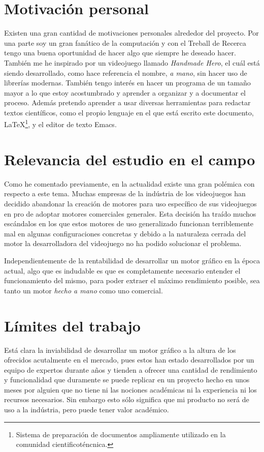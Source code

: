 \section{Motivación personal}
Existen una gran cantidad de motivaciones personales alrededor del proyecto. Por una parte soy un gran fanático de la computación y con el Treball de Recerca tengo una buena oportunidad de hacer algo que siempre he deseado hacer. También me he inspirado por un videojuego llamado \textit{Handmade Hero}, el cuál está siendo desarrollado, como hace referencia el nombre, \textit{a mano}, sin hacer uso de librerías modernas. También tengo interés en hacer un programa de un tamaño mayor a lo que estoy acostumbrado y aprender a organizar y a documentar el proceso. Además pretendo aprender a usar diversas herramientas para redactar textos científicos, como el propio lenguaje en el que está escrito este documento, \LaTeX\footnote{Sistema de preparación de documentos ampliamente utilizado en la comunidad cientificoténcnica.}, y el editor de texto Emacs.

\section{Relevancia del estudio en el campo}
Como he comentado previamente, en la actualidad existe una gran polémica con respecto a este tema. Muchas empresas de la indústria de los videojuegos han decidido abandonar la creación de motores para uso específico de sus videojuegos en pro de adoptar motores comerciales generales. Esta decisión ha traído muchos escándalos en los que estos motores de uso generalizado funcionan terriblemente mal en algunas configuraciones concretas y debido a la naturaleza cerrada del motor la desarrolladora del videojuego no ha podido solucionar el problema.

Independientemente de la rentabilidad de desarrollar un motor gráfico en la época actual, algo que es indudable es que es completamente necesario entender el funcionamiento del mismo, para poder extraer el máximo rendimiento posible, sea tanto un motor \textit{hecho a mano} como uno comercial.

\section{Límites del trabajo}
Está clara la inviabilidad de desarrollar un motor gráfico a la altura de los ofrecidos acutalmente en el mercado, pues estos han estado desarrollados por un equipo de expertos durante años y tienden a ofrecer una cantidad de rendimiento y funcionalidad que duramente se puede replicar en un proyecto hecho en unos meses por alguien que no tiene ni las nociones académicas ni la experiencia ni los recursos necesarios. Sin embargo esto sólo significa que mi producto no será de uso a la indústria, pero puede tener valor académico.

